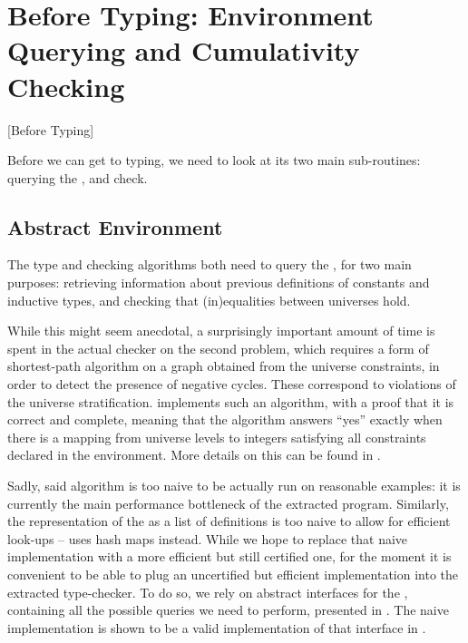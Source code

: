\section{Before Typing: Environment Querying and Cumulativity Checking}[Before Typing]
\label{sec:kernel-subroutines}

Before we can get to typing, we need to look at its two main sub-routines:
querying the , and  check.

\subsection{Abstract Environment}

The type and  checking algorithms both need to query the ,
for two main purposes: retrieving information about previous definitions of constants and inductive
types, and checking that (in)equalities between universes hold.

While this might seem anecdotal,
a surprisingly important amount of time is spent in the actual checker on the second problem, which
requires a form of shortest-path algorithm on a graph obtained from the universe constraints, in order
to detect the presence of negative cycles.
These correspond to violations of the universe stratification.
 implements such an algorithm, with a proof that it is correct and complete, meaning that
the algorithm answers “yes” exactly when there is a mapping from universe levels to integers satisfying
all constraints declared in the environment.
More details on this can be found in .

Sadly, said algorithm is too naive to be actually run on reasonable examples: it is currently the main
performance bottleneck of the extracted program. Similarly, the representation of the
 as a list of definitions is too naive to allow for efficient look-ups –
 uses hash maps instead.
While we hope to replace that naive implementation with a more efficient but still certified one,
for the moment it is convenient to be able to plug an uncertified but efficient implementation
into the extracted type-checker. To do so, we rely on abstract interfaces for the
, containing all the possible queries we need to perform,
presented in . The naive implementation is shown to be a valid implementation of
that interface in .

